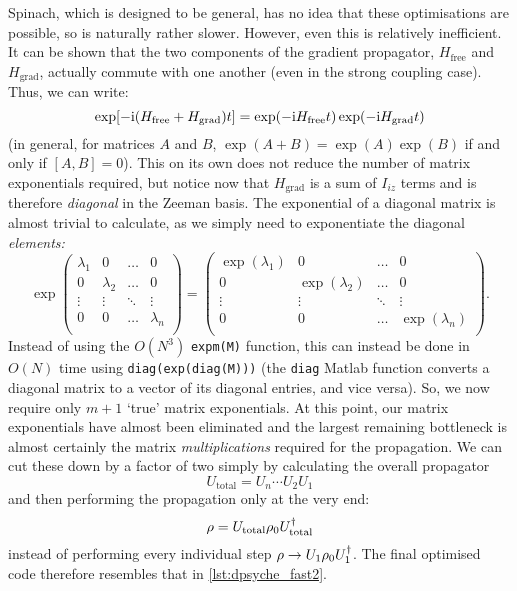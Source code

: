 Spinach, which is designed to be general, has no idea that these optimisations are possible, so is naturally rather slower.
However, even this is relatively inefficient.
It can be shown that the two components of the gradient propagator, $H_\text{free}$ and $H_\text{grad}$, actually commute with one another (even in the strong coupling case).
Thus, we can write:
\begin{equation}
    \label{eq:split_propagator}
    \exp[-\mathrm{i}(H_\text{free} + H_\text{grad}) t] = \exp(-\mathrm{i} H_\text{free} t) \exp(-\mathrm{i} H_\text{grad} t)
\end{equation}
(in general, for matrices $A$ and $B$, $\exp(A + B) = \exp(A)\exp(B)$ if and only if $[A, B] = 0$).
This on its own does not reduce the number of matrix exponentials required, but notice now that $H_\text{grad}$ is a sum of $I_{iz}$ terms and is therefore \textit{diagonal} in the Zeeman basis.
The exponential of a diagonal matrix is almost trivial to calculate, as we simply need to exponentiate the diagonal \textit{elements:}
\begin{equation}
    \label{eq:expm_diagonal}
    \exp
    \begin{pmatrix}
        \lambda_1 & 0 & \ldots & 0 \\
        0 & \lambda_2 & \ldots & 0 \\
        \vdots & \vdots & \ddots & \vdots \\
        0 & 0 & \ldots & \lambda_n \\
    \end{pmatrix}
    = 
    \begin{pmatrix}
        \exp(\lambda_1) & 0 & \ldots & 0 \\
        0 & \exp(\lambda_2) & \ldots & 0 \\
        \vdots & \vdots & \ddots & \vdots \\
        0 & 0 & \ldots & \exp(\lambda_n) \\
    \end{pmatrix}.
\end{equation}
Instead of using the $O(N^3)$ \texttt{expm(M)} function, this can instead be done in $O(N)$ time using \texttt{diag(exp(diag(M)))} (the \texttt{diag} Matlab function converts a diagonal matrix to a vector of its diagonal entries, and vice versa).
So, we now require only $m + 1$ `true' matrix exponentials.
At this point, our matrix exponentials have almost been eliminated and the largest remaining bottleneck is almost certainly the matrix \textit{multiplications} required for the propagation.
We can cut these down by a factor of two simply by calculating the overall propagator
\begin{equation}
    \label{eq:overall_propagator}
    U_\text{total} = U_n\cdots U_2U_1
\end{equation}
and then performing the propagation only at the very end:
\begin{equation}
    \label{eq:overall_propagation}
    \rho = U_\text{total} \rho_0 U_\text{total}^\dagger
\end{equation}
instead of performing every individual step $\rho \to U_1\rho_0U_1^\dagger$.
The final optimised code therefore resembles that in \cref{lst:dpsyche_fast2}.

